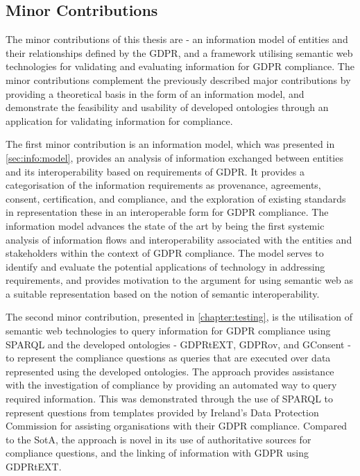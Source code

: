 \subsection*{Minor Contributions}
The minor contributions of this thesis are - an information model of entities and their relationships defined by the GDPR, and a framework utilising semantic web technologies for validating and evaluating information for GDPR compliance. The minor contributions complement the previously described major contributions by providing a theoretical basis in the form of an information model, and demonstrate the feasibility and usability of developed ontologies through an application for validating information for compliance.

The first minor contribution is an information model, which was presented in \autoref{sec:info:model}, provides an analysis of information exchanged between entities and its interoperability based on requirements of GDPR.
It provides a categorisation of the information requirements as provenance, agreements, consent, certification, and compliance, and the exploration of existing standards in representation these in an interoperable form for GDPR compliance.
The information model advances the state of the art by being the first systemic analysis of information flows and interoperability associated with the entities and stakeholders within the context of GDPR compliance.
The model serves to identify and evaluate the potential applications of technology in addressing requirements, and provides motivation to the argument for using semantic web as a suitable representation based on the notion of semantic interoperability.

The second minor contribution, presented in \autoref{chapter:testing}, is the utilisation of semantic web technologies to query information for GDPR compliance using SPARQL and the developed ontologies - GDPRtEXT, GDPRov, and GConsent - to represent the compliance questions as queries that are executed over data represented using the developed ontologies.
The approach provides assistance with the investigation of compliance by providing an automated way to query required information. This was demonstrated through the use of SPARQL to represent questions from templates provided by Ireland's Data Protection Commission for assisting organisations with their GDPR compliance.
Compared to the SotA, the approach is novel in its use of authoritative sources for  compliance questions, and the linking of information with GDPR using GDPRtEXT.

